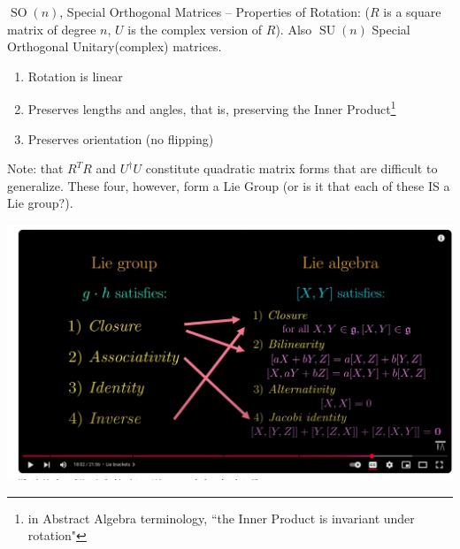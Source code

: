 \documentclass[12pt,a4paper]{report}
\newcommand{\SOG}{\operatorname{SO}}
\newcommand{\SUG}{\operatorname{SU}}
\newcommand{\OG}{\operatorname{O}}
\newcommand{\UG}{\operatorname{U}}
\begin{document}
	$\SOG(n)$, Special Orthogonal Matrices -- Properties of Rotation:  ($R$ is a square matrix of degree $n$, $U$ is the complex version of $R$).  Also $\SUG(n)$ Special Orthogonal Unitary(complex) matrices.
\begin{enumerate}
	\item Rotation is linear 
	\item Preserves lengths and angles, that is, preserving the Inner Product\footnote{in Abstract Algebra terminology, ``the Inner Product is invariant under rotation"}
	\item Preserves orientation (no flipping)
\end{enumerate}

Note: that $R^TR$ and $U^\dagger U$ constitute quadratic matrix forms that are difficult to generalize. These four, however, form a Lie Group (or is it that each of these IS a Lie group?).
\begin{center}
\fbox{
\begin{tabular}{cc}
	$\OG(n)$ & $\SOG(n)$\\
	$\UG(n)$ & $\SUG(n)$
\end{tabular}
}
\end{center}

\includegraphics[scale=.4]{LieGroupVsLieBracket.png} 
\end{document}
